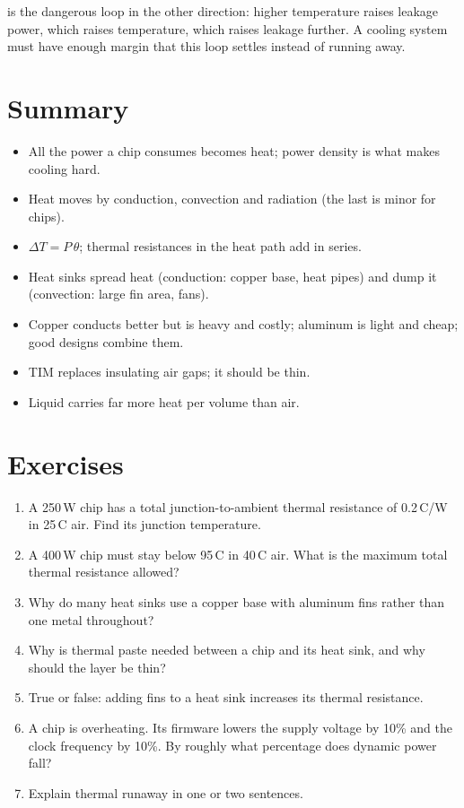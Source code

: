  is the dangerous loop in the other direction: higher temperature raises leakage power, which raises temperature, which raises leakage further. A cooling system must have enough margin that this loop settles instead of running away.

\section{Summary}

\begin{itemize}
  \item All the power a chip consumes becomes heat; power density is what makes cooling hard.
  \item Heat moves by conduction, convection and radiation (the last is minor for chips).
  \item $\Delta T = P\,\theta$; thermal resistances in the heat path add in series.
  \item Heat sinks spread heat (conduction: copper base, heat pipes) and dump it (convection: large fin area, fans).
  \item Copper conducts better but is heavy and costly; aluminum is light and cheap; good designs combine them.
  \item TIM replaces insulating air gaps; it should be thin.
  \item Liquid carries far more heat per volume than air.
\end{itemize}

\section{Exercises}

\begin{enumerate}
  \item A 250\,W chip has a total junction-to-ambient thermal resistance of 0.2\,\textdegree C/W in 25\,\textdegree C air. Find its junction temperature.
  \item A 400\,W chip must stay below 95\,\textdegree C in 40\,\textdegree C air. What is the maximum total thermal resistance allowed?
  \item Why do many heat sinks use a copper base with aluminum fins rather than one metal throughout?
  \item Why is thermal paste needed between a chip and its heat sink, and why should the layer be thin?
  \item True or false: adding fins to a heat sink increases its thermal resistance.
  \item A chip is overheating. Its firmware lowers the supply voltage by 10\% and the clock frequency by 10\%. By roughly what percentage does dynamic power fall?
  \item Explain thermal runaway in one or two sentences.
\end{enumerate}

